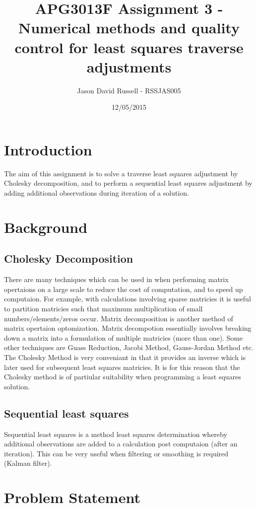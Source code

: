 \documentclass{article}
\title{APG3013F Assignment 3 - Numerical methods and quality control for least squares traverse adjustments}
\date{12/05/2015}
\author{Jason David Russell - RSSJAS005}
\begin{document}
\maketitle
{}

\newpage
\tableofcontents


\newpage
\section{Introduction}
The aim of this assignment is to solve a traverse least squares adjustment by Cholesky decomposition,
and to perform a sequential least squares adjustment by adding additional observations during iteration
of a solution.

\section{Background}
\subsection{Cholesky Decomposition}
There are many techniques which can be used in when performing matrix opertaions on a large scale to 
reduce the cost of computation, and to speed up computaion. For example, with calculations involving sparse 
matricies it is useful to partition matricies such that maximum multiplication of small numbers/elements/zeros
occur. Matrix decomposition is another method of matrix opertaion optomization. Matrix decompotion essentially
involves breaking down a matrix into a formulation of multiple matricies (more than one). Some other techniques are
Guass Reduction, Jacobi Method, Gauss-Jordan Method etc. The Cholesky Method is very conveniant in that 
it provides an inverse which is later used for subsequent least squares matricies. It is for this reason that
the Cholesky method is of partiular suitability when programming a least squares solution.

\subsection{Sequential least squares}
Sequential least squares is a method least squares determination whereby additional observations
are added to a calculation post computaion (after an iteration). This can be very useful when filtering or smoothing
is required (Kalman filter).

\section{Problem Statement}
\end{document}
